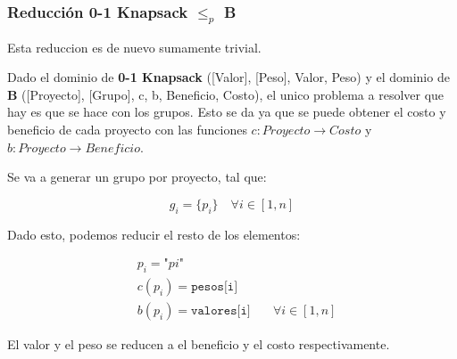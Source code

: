 \subsubsection*{Reducci\'on 0-1 Knapsack $\le_{p}$ B }

Esta reduccion es de nuevo sumamente trivial. 

Dado el dominio de \textbf{0-1 Knapsack} ([Valor], [Peso], Valor, Peso) y 
el dominio de \textbf{B} ([Proyecto], [Grupo], c, b, Beneficio, Costo), el unico 
problema a resolver que hay es que se hace con los grupos. Esto se da ya que 
se puede obtener el costo y beneficio de cada proyecto con las funciones 
$c: Proyecto \rightarrow Costo$ y 
$b: Proyecto \rightarrow Beneficio$.

Se va a generar un grupo por proyecto, tal que: 

\[
  g_i = \{p_i\} \quad \forall i \in [1, n]
\]

Dado esto, podemos reducir el resto de los elementos: 

\begin{align*}
  &p_i = \texttt{"$pi$"} &\\
  &c(p_i) = \texttt{pesos[i]} &\\
  &b(p_i) = \texttt{valores[i]} &\quad \forall i \in [1, n] 
\end{align*}

El valor y el peso se reducen a el beneficio y el costo respectivamente.

